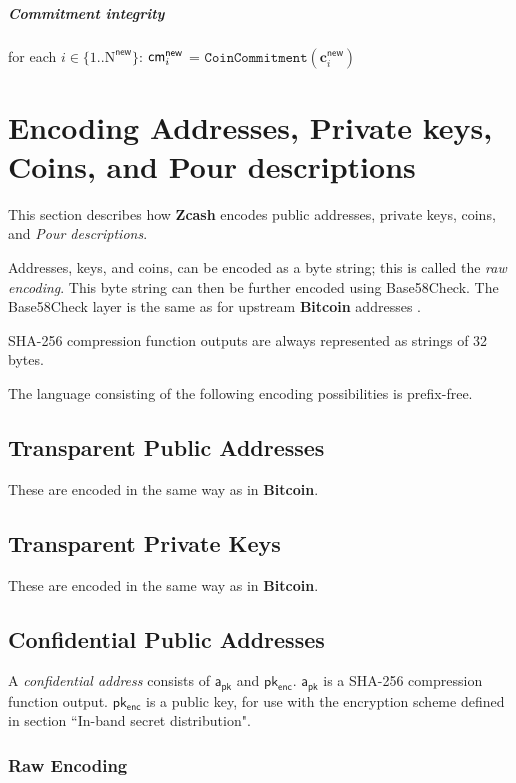 \documentclass{article}
\newcommand{\changedcolor}{magenta}
\newcommand{\setchanged}{\color{\changedcolor}}
\newcommand{\changed}[1]{{\setchanged{#1}}}
\newcommand{\term}[1]{\textsl{#1}\xspace}
\newcommand{\termbf}[1]{\textbf{#1}\xspace}
\newcommand{\Zcash}{\termbf{Zcash}}
\newcommand{\Bitcoin}{\termbf{Bitcoin}}
\newcommand{\PourDescriptions}{\term{Pour descriptions}}
\newcommand{\publicAddress}{\term{confidential address}}
\newcommand{\SpendAuthorityPublic}{\mathsf{a_{pk}}}
\newcommand{\TransmitPublic}{\mathsf{pk_{enc}}}
\newcommand{\cmNew}[1]{\mathsf{{cm}^{new}_\mathnormal{#1}}}
\newcommand{\NNew}{\mathrm{N}^\mathsf{new}}
\newcommand{\cNew}[1]{\mathbf{c}_{#1}^\mathsf{new}}
\newcommand{\CoinCommitment}[1]{\mathtt{CoinCommitment}(#1)}
\begin{document}
\subparagraph{Commitment integrity}

for each $i \in \{1..\NNew\}$: $\cmNew{i}$ = $\CoinCommitment{\cNew{i}}$

\section{Encoding Addresses, Private keys, Coins, and Pour descriptions}

This section describes how \Zcash encodes public addresses, private keys,
coins, and \PourDescriptions.

Addresses, keys, and coins, can be encoded as a byte string; this is called
the \term{raw encoding}. This byte string can then be further encoded using
Base58Check. The Base58Check layer is the same as for upstream \Bitcoin
addresses \cite{Base58Check}.

SHA-256 compression function outputs are always represented as strings of 32
bytes.

The language consisting of the following encoding possibilities is prefix-free.

\subsection{Transparent Public Addresses}

These are encoded in the same way as in \Bitcoin \cite{Base58Check}.

\subsection{Transparent Private Keys}

These are encoded in the same way as in \Bitcoin \cite{Base58Check}.

\subsection{Confidential Public Addresses}

A \publicAddress consists of $\SpendAuthorityPublic$ and $\TransmitPublic$.
$\SpendAuthorityPublic$ is a SHA-256 compression function output.
$\TransmitPublic$ is a \changed{Curve25519} public key, for use with the
encryption scheme defined in section ``In-band secret distribution".

\subsubsection{Raw Encoding}
\end{document}

